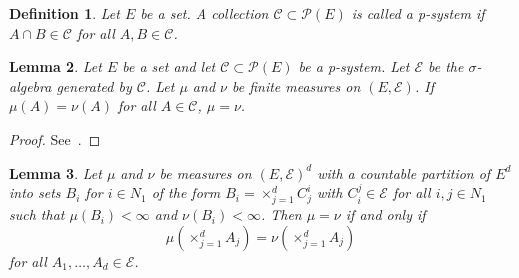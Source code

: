 \documentclass[english,twoside,openright]{HYgraduMLDS}
\newtheorem{lemma}{Lemma}[chapter]
\newtheorem{definition}[lemma]{Definition}
\DeclareMathOperator*{\bigtimes}{\times}
\begin{document}
\begin{definition}
	Let \(E\) be a set. A collection \(\mathcal{C}\subset \mathcal{P}(E)\) is
  called a p-system if \(A\cap B\in \mathcal{C}\) for all
  \(A, B\in \mathcal{C}\).
\end{definition}
\begin{lemma}\label{p_system_measure_equality_lemma}
  Let \(E\) be a set and let \(\mathcal{C}\subset \mathcal{P}(E)\) be a
  p-system. Let \(\mathcal{E}\) be the \(\sigma\)-algebra generated by
  \(\mathcal{C}\). Let
  \(\mu\) and \(\nu\) be finite measures on \((E, \mathcal{E})\).
  If \(\mu(A) = \nu(A)\) for all \(A\in \mathcal{C}\), \(\mu = \nu\).
\end{lemma}
\begin{proof}
	See~\cite[Proposition 3.7]{Cin11}.
\end{proof}
\begin{lemma}\label{product_measurable_space_equality_lemma}
	Let \(\mu\) and \(\nu\) be measures on \((E, \mathcal{E})^{d}\) with
  a countable partition of \(E^{d}\) into sets \(B_{i}\) for \(i\in N_{1}\)
  of the form
  \(B_{i} = \bigtimes_{j=1}^{d}C_{j}^{i}\) with
  \(C_{i}^{j}\in \mathcal{E}\) for all \(i, j\in N_{1}\) such that
  \(\mu(B_{i}) < \infty\) and \(\nu(B_{i}) < \infty\). Then \(\mu = \nu\)
  if and only if
  \[
    \mu\left(\bigtimes_{j=1}^{d}A_{j}\right)
    = \nu\left(\bigtimes_{j=1}^{d}A_{j}\right)
  \]
  for all \(A_{1},\dotsc, A_{d} \in \mathcal{E}\).
\end{lemma}
\end{document}
